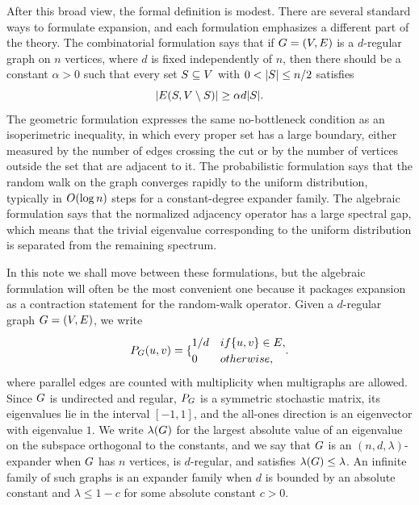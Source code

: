 After this broad view, the formal definition is modest. There are several standard ways to formulate expansion, and each formulation emphasizes a different part of the theory. The combinatorial formulation says that if \(G=(V,E)\) is a \(d\)-regular graph on \(n\) vertices, where \(d\) is fixed independently of \(n\), then there should be a constant \(\alpha>0\) such that every set \(S\subseteq V\) with \(0<\lvert S\rvert\leq n/2\) satisfies
\begin{equation}
	\label{eq:introduction-edge-expansion}
	\lvert E(S,V\setminus S)\rvert\geq \alpha d\lvert S\rvert.
\end{equation}
The geometric formulation expresses the same no-bottleneck condition as an isoperimetric inequality, in which every proper set has a large boundary, either measured by the number of edges crossing the cut or by the number of vertices outside the set that are adjacent to it. The probabilistic formulation says that the random walk on the graph converges rapidly to the uniform distribution, typically in \(\bigO(\log n)\) steps for a constant-degree expander family. The algebraic formulation says that the normalized adjacency operator has a large spectral gap, which means that the trivial eigenvalue corresponding to the uniform distribution is separated from the remaining spectrum.

In this note we shall move between these formulations, but the algebraic formulation will often be the most convenient one because it packages expansion as a contraction statement for the random-walk operator. Given a \(d\)-regular graph \(G=(V,E)\), we write
\begin{equation}
	\label{eq:introduction-random-walk-matrix}
	\Markov{\Graph}(u,v)=
	\begin{cases}
		1/d & \text{if } \{u,v\}\in\Edges, \\
		0   & \text{otherwise,}
	\end{cases}
\end{equation}
where parallel edges are counted with multiplicity when multigraphs are allowed. Since \(G\) is undirected and regular, \(P_{G}\) is a symmetric stochastic matrix, its eigenvalues lie in the interval \([-1,1]\), and the all-ones direction is an eigenvector with eigenvalue \(1\). We write \(\lambda(G)\) for the largest absolute value of an eigenvalue on the subspace orthogonal to the constants, and we say that \(G\) is an \((n,d,\lambda)\)-expander when \(G\) has \(n\) vertices, is \(d\)-regular, and satisfies \(\lambda(G)\leq\lambda\). An infinite family of such graphs is an expander family when \(d\) is bounded by an absolute constant and \(\lambda\leq 1-c\) for some absolute constant \(c>0\).

